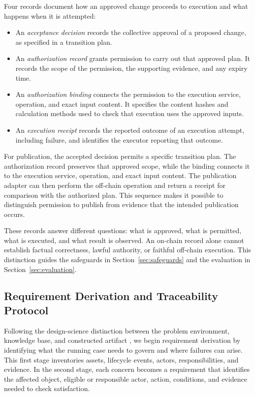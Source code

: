 \documentclass[journal]{IEEEtran}
\begin{document}
Four records document how an approved change proceeds to
execution and what happens when it is attempted:
\begin{itemize}
    \item An \emph{acceptance decision} records the collective
    approval of a proposed change, as specified in a
    transition plan.

    \item An \emph{authorization record} grants permission
    to carry out that approved plan. It records the scope
    of the permission, the supporting evidence, and any
    expiry time.

    \item An \emph{authorization binding} connects the
    permission to the execution service, operation, and
    exact input content. It specifies the content hashes
    and calculation methods used to check that execution
    uses the approved inputs.

    \item An \emph{execution receipt} records the reported
    outcome of an execution attempt, including failure,
    and identifies the executor reporting that outcome.
\end{itemize}

For publication, the accepted decision permits a specific transition
plan. The authorization record preserves that approved scope, while
the binding connects it to the execution service, operation, and exact
input content. The publication adapter can then perform the off-chain
operation and return a receipt for comparison with the authorized plan.
This sequence makes it possible to distinguish permission to publish
from evidence that the intended publication occurs.

These records answer different questions: what is approved,
what is permitted, what is executed, and what result is observed.
An on-chain record alone cannot establish factual correctness,
lawful authority, or faithful off-chain execution.
This distinction guides the safeguards in
Section~\ref{sec:safeguards} and the evaluation in
Section~\ref{sec:evaluation}.

\subsection{Requirement Derivation and Traceability Protocol}
\label{sec:derivation_protocol}

Following the design-science distinction between the problem environment,
knowledge base, and constructed artifact \cite{hevner2004design}, we
begin requirement derivation by identifying what the running case needs
to govern and where failures can arise. This first stage inventories
assets, lifecycle events, actors, responsibilities, and evidence.
In the second stage, each concern becomes a requirement that identifies
the affected object, eligible or responsible actor, action, conditions,
and evidence needed to check satisfaction.
\end{document}
